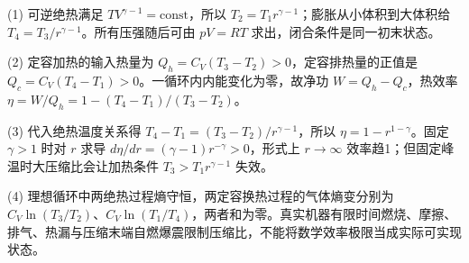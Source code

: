 (1) 可逆绝热满足 \(TV^{\gamma-1}=\mathrm{const}\)，所以 \(\boxed{T_2=T_1r^{\gamma-1}}\)；膨胀从小体积到大体积给 \(\boxed{T_4=T_3/r^{\gamma-1}}\)。所有压强随后可由 \(pV=RT\) 求出，闭合条件是同一初末状态。

(2) 定容加热的输入热量为 \(Q_h=C_V(T_3-T_2)>0\)，定容排热量的正值是 \(Q_c=C_V(T_4-T_1)>0\)。一循环内内能变化为零，故净功 \(W=Q_h-Q_c\)，热效率 \(\eta=W/Q_h=1-(T_4-T_1)/(T_3-T_2)\)。

(3) 代入绝热温度关系得 \(T_4-T_1=(T_3-T_2)/r^{\gamma-1}\)，所以 \(\boxed{\eta=1-r^{1-\gamma}}\)。固定 \(\gamma>1\) 时对 \(r\) 求导 \(d\eta/dr=(\gamma-1)r^{-\gamma}>0\)，形式上 \(r\to\infty\) 效率趋1；但固定峰温时大压缩比会让加热条件 \(T_3>T_1r^{\gamma-1}\) 失效。

(4) 理想循环中两绝热过程熵守恒，两定容换热过程的气体熵变分别为 \(C_V\ln(T_3/T_2)\)、\(C_V\ln(T_1/T_4)\)，两者和为零。真实机器有限时间燃烧、摩擦、排气、热漏与压缩末端自燃爆震限制压缩比，不能将数学效率极限当成实际可实现状态。
